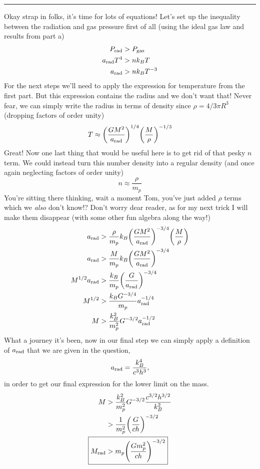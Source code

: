 \documentclass[12pt, letterpaper, twoside]{article}
\newcommand{\answer}[1]{
    \par\noindent\rule{\textwidth}{0.4pt}#1\vspace{0.5cm}
}
\begin{document}
\answer{
    Okay strap in folks, it's time for lots of equations! Let's set up the inequality between the radiation and gas pressure first of all (using the ideal gas law and results from part a)
    \begin{align}
        P_{\rm rad} &> P_{\rm gas} \\
        a_{\rm rad} T^4 &> n k_B T \\
        a_{\rm rad} &> n k_B T^{-3}
    \end{align}
    For the next steps we'll need to apply the expression for temperature from the first part. But this expression contains the radius and we don't want that! Never fear, we can simply write the radius in terms of density since $\rho = 4/3 \pi R^3$ (dropping factors of order unity)
    \begin{equation}
        T \approx \qty(\frac{G M^2}{a_{\rm rad}})^{1/4} \qty(\frac{M}{\rho})^{-1/3}
    \end{equation}
    Great! Now one last thing that would be useful here is to get rid of that pesky $n$ term. We could instead turn this number density into a regular density (and once again neglecting factors of order unity)
    \begin{equation}
        n \approx \frac{\rho}{m_p}
    \end{equation}
    You're sitting there thinking, wait a moment Tom, you've just added $\rho$ terms which we \textit{also} don't know!? Don't worry dear reader, as for my next trick I will make them disappear (with some other fun algebra along the way!)
    \begin{align}
        a_{\rm rad} &> \frac{\rho}{m_p} k_B \qty(\frac{G M^2}{a_{\rm rad}})^{-3/4} \qty(\frac{M}{\rho}) \\
        a_{\rm rad} &> \frac{M}{m_p} k_B \qty(\frac{G M^2}{a_{\rm rad}})^{-3/4} \\
        M^{1/2} a_{\rm rad} &> \frac{k_B}{m_p} \qty(\frac{G}{a_{\rm rad}})^{-3/4} \\
        M^{1/2} &> \frac{k_B G^{-3/4}}{m_p} a_{\rm rad}^{-1/4} \\
        M &> \frac{k_B^2}{m_p^2} G^{-3/2} a_{\rm rad}^{-1/2}
    \end{align}
    What a journey it's been, now in our final step we can simply apply a definition of $a_{\rm rad}$ that we are given in the question,
    \begin{equation}
        a_{\rm rad} = \frac{k_B^4}{c^3 h^3},
    \end{equation}
    in order to get our final expression for the lower limit on the mass.
    \begin{align}
        M &> \frac{k_B^2}{m_p^2} G^{-3/2} \frac{c^{3/2} h^{3/2}}{k_B^2} \\
          &> \frac{1}{m_p^2} \qty(\frac{G}{c h})^{-3/2} \\
        \Aboxed{ M_{\rm rad} &> m_p \qty(\frac{G m_p^2}{c h})^{-3/2} }
    \end{align}
}
\end{document}
